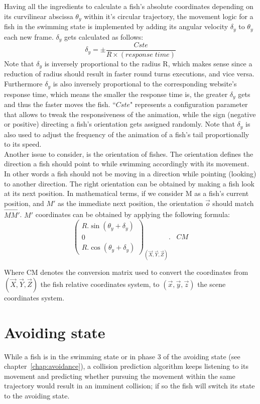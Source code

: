 Having all the ingredients to calculate a fish's absolute coordinates depending on its curvilinear abscissa $\theta_{y}$ within it's circular trajectory, the movement logic for a fish in the swimming state is implemented by adding its angular velocity $\delta_{y}$ to $\theta_{y}$ each new frame. $\delta_y$ gets calculated as follows:
\[
\delta_y = \pm \frac{Cste}{R \times (response\; time)}
\]
Note that $\delta_{y}$ is inversely proportional to the radius R, which makes sense since a reduction of radius should result in faster round turns executions, and vice versa. Furthermore $\delta_y$ is also inversely proportional to the corresponding website's response time, which means the smaller the response time is, the greater $\delta_{y}$ gets and thus the faster moves the fish. ``$Cste$" represents a configuration parameter that allows to tweak the responsiveness of the animation, while the sign (negative or positive) directing a fish's orientation gets assigned randomly. Note that $\delta_{y}$ is also used to adjust the frequency of the animation of a fish's tail proportionally to its speed.\\


Another issue to consider, is the orientation of fishes. The orientation defines the direction a fish should point to while swimming accordingly with its movement. In other words a fish should not be moving in a direction while pointing (looking) to another direction. The right orientation can be obtained by making a fish look at its next position. In mathematical terms, if we consider M as a fish's current position, and $M'$ as the immediate next position, the orientation $\overrightarrow{o}$ should match $\overrightarrow{MM'}$. $M'$ coordinates can be obtained by applying the following formula:
\[
\begin{pmatrix}
R . \sin{(\theta_{y} + \delta_y)} \\
0 \\
R . \cos{(\theta_{y}  + \delta_y)}
\end{pmatrix}_{(\overrightarrow{X}, \overrightarrow{Y}, \overrightarrow{Z})} . \;\;\; CM
\]

Where CM denotes the conversion matrix used to convert the coordinates from $(\overrightarrow{X}, \overrightarrow{Y}, \overrightarrow{Z})$ the fish relative coordinates system, to $(\overrightarrow{x}, \overrightarrow{y}, \overrightarrow{z})$ the scene coordinates system.

\section{Avoiding state}
While a fish is in the swimming state or in phase 3 of the avoiding state (see chapter~\ref{chap:avoidance}), a collision prediction algorithm keeps listening to its movement and predicting whether pursuing the movement within the same trajectory would result in an imminent collision; if so the fish will switch its state to the avoiding state.

